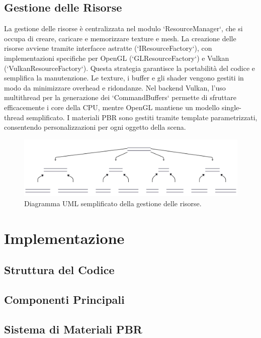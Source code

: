 \documentclass[12pt,a4paper,openright,twoside]{book}
\begin{document}
\section{Gestione delle Risorse}
La gestione delle risorse è centralizzata nel modulo `ResourceManager`, che si occupa di creare, caricare e memorizzare
texture e mesh. La creazione delle risorse avviene tramite interfacce astratte (`IResourceFactory`), con implementazioni
specifiche per OpenGL (`GLResourceFactory`) e Vulkan (`VulkanResourceFactory`). Questa strategia garantisce la portabilità
del codice e semplifica la manutenzione. Le texture, i buffer e gli shader vengono gestiti in modo da minimizzare
overhead e ridondanze. Nel backend Vulkan, l'uso multithread per la generazione dei `CommandBuffers` permette di
sfruttare efficacemente i core della CPU, mentre OpenGL mantiene un modello single-thread semplificato. I materiali PBR
sono gestiti tramite template parametrizzati, consentendo personalizzazioni per ogni oggetto della scena.
\begin{figure}[H!]
    \centering
    \includegraphics[width=.8\linewidth]{figures/uml_resources.pdf}
    \caption{Diagramma UML semplificato della gestione delle risorse.}
    \label{fig:uml-resources}
\end{figure}

\chapter{Implementazione}
\label{chap:implementazione}

\section{Struttura del Codice}

\section{Componenti Principali}

\section{Sistema di Materiali PBR}
\end{document}
